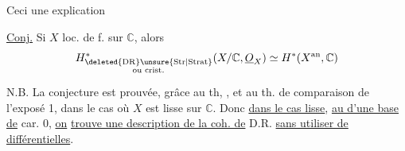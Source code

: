Ceci  une explication

\uline{Conj.} Si $X$ loc. de  f. sur $\mathbb C$, alors
\[
H^*_{\substack{\deleted{\mathrm{DR}}\unsure{\mathrm{Str}|\mathrm{Strat}}\\\text{ou }\mathrm{crist.}}}(X/\mathbb C,\underline O_X)\simeq H^*(X^{\mathrm{an}},\mathbb C)
\]

N.B. La conjecture est prouvée, grâce au th, , et au th. de comparaison de l'exposé 1, dans le cas où $X$ est lisse sur $\mathbb C$. Donc \uline{dans le cas lisse}, \uline{au  d'une base de} car. $0$, \uline{on} \uline{trouve une description de la coh. de} D.R. \uline{sans utiliser de différentielles}.

